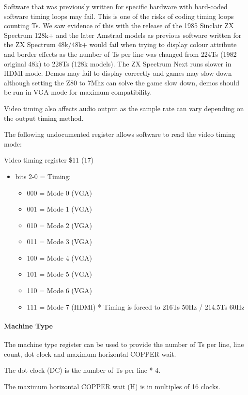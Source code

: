 Software that was previously written for specific hardware with
hard-coded software timing loops may fail. This is one of the risks of
coding timing loops counting Ts. We saw evidence of this with the
release of the 1985 Sinclair ZX Spectrum 128k+ and the later Amstrad
models as previous software written for the ZX Spectrum 48k/48k+ would
fail when trying to display colour attribute and border effects as the
number of Ts per line was changed from 224Ts (1982 original 48k) to
228Ts (128k models). The ZX Spectrum Next runs slower in HDMI
mode. Demos may fail to display correctly and games may slow down
although setting the Z80 to 7Mhz can solve the game slow down, demos
should be run in VGA mode for maximum compatibility.

Video timing also affects audio output as the sample rate can vary
depending on the output timing method.

The following undocumented register allows software to read the video
timing mode:

Video timing register \$11 (17)
\begin{itemize}
\item[] bits 2-0 = Timing:
  \begin{itemize}
  \item[] 000 = Mode 0 (VGA)
  \item[] 001 = Mode 1 (VGA)
  \item[] 010 = Mode 2 (VGA)
  \item[] 011 = Mode 3 (VGA)
  \item[] 100 = Mode 4 (VGA)
  \item[] 101 = Mode 5 (VGA)
  \item[] 110 = Mode 6 (VGA)
  \item[] 111 = Mode 7 (HDMI) * Timing is forced to 216Ts 50Hz / 214.5Ts 60Hz
  \end{itemize}
\end{itemize}

\paragraph{Machine Type}

The machine type register can be used to provide the number of Ts per
line, line count, dot clock and maximum horizontal COPPER wait.

The dot clock (DC) is the number of Ts per line * 4.

The maximum horizontal COPPER wait (H) is in multiples of 16 clocks.

